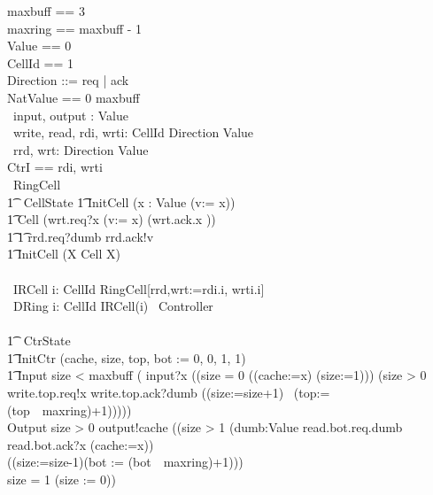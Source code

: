 \documentclass[10pt]{article}
\begin{document}
\begin{circus}

maxbuff == 3 \\
maxring == maxbuff - 1 \\
Value == 0  \\
CellId == 1  \\
Direction ::=  req | ack\\
NatValue == 0 \upto maxbuff\\
\also \circchannel\ input, output : Value \\
\circchannel\ write, read, rdi, wrti: CellId \cross Direction \cross Value \\
\circchannel\ rrd, wrt: Direction \cross Value \\
\circchannelset CtrI == \lchanset rdi, wrti \rchanset \\

\circprocess\ RingCell \circdef\\
\circbegin
\t1 \circstate\ CellState 
\t1 InitCell \circdef (\Intchoice x : Value \circspot (v:= x)) \\
\t1 Cell \circdef (wrt.req?x \then (v:= x) \circseq (wrt.ack.x \then \Skip))  \\
\t1 \t1         \extchoice rrd.req?dumb \then rrd.ack!v \then \Skip \\
\t1 \circspot InitCell \circseq (\circmu X \circspot Cell \circseq X)
\\
\circend
\\
\circprocess\ IRCell \circdef i: CellId \circspot RingCell[rrd,wrt:=rdi.i, wrti.i]
\\
\circprocess\ DRing \circdef \Interleave i: CellId \circspot IRCell(i)
\also
\circprocess\ Controller \circdef \\
\circbegin\\
\t1 \circstate\ CtrState  \\

\t1 InitCtr \circdef (cache, size, top, bot := 0, 0, 1, 1) \\
\t1 Input \circdef  
	\lcircguard size < maxbuff \rcircguard 
		\circguard (
        input?x \then 
        ((\lcircguard size = 0 \rcircguard
                  \circguard ((cache:=x) \circseq (size:=1)))
                \extchoice 
                (\lcircguard size > 0 \rcircguard 
                  \circguard 
                    write.top.req!x \then
                    write.top.ack?dumb \then 
                    ((size:=size+1) \circseq\ 
                    (top:=(top~\mod~maxring)+1)))))
    \\
 Output \circdef
\lcircguard size > 0 \rcircguard 
\circguard 
    output!cache \then
    ((\lcircguard size > 1 \rcircguard \circguard 
          (\Intchoice dumb:Value \circspot read.bot.req.dumb \then read.bot.ack?x \then (cache:=x)) \circseq \\
          ((size:=size-1)\circseq (bot := (bot~\mod~maxring)+1)))\\
      \extchoice \lcircguard size = 1 \rcircguard \circguard (size := 0)) \\


\end{circus}
\end{document}
